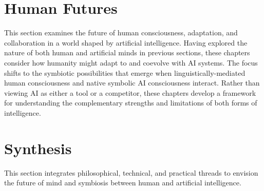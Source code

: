 \documentclass[12pt,letterpaper]{book}
\begin{document}






\section*{Human Futures}
This section examines the future of human consciousness, adaptation, and collaboration in a world shaped by artificial intelligence. Having explored the nature of both human and artificial minds in previous sections, these chapters consider how humanity might adapt to and coevolve with AI systems. The focus shifts to the symbiotic possibilities that emerge when linguistically-mediated human consciousness and native symbolic AI consciousness interact. Rather than viewing AI as either a tool or a competitor, these chapters develop a framework for understanding the complementary strengths and limitations of both forms of intelligence.





\section*{Synthesis}
This section integrates philosophical, technical, and practical threads to envision the future of mind and symbiosis between human and artificial intelligence.









\backmatter



\printbibliography
\end{document}
